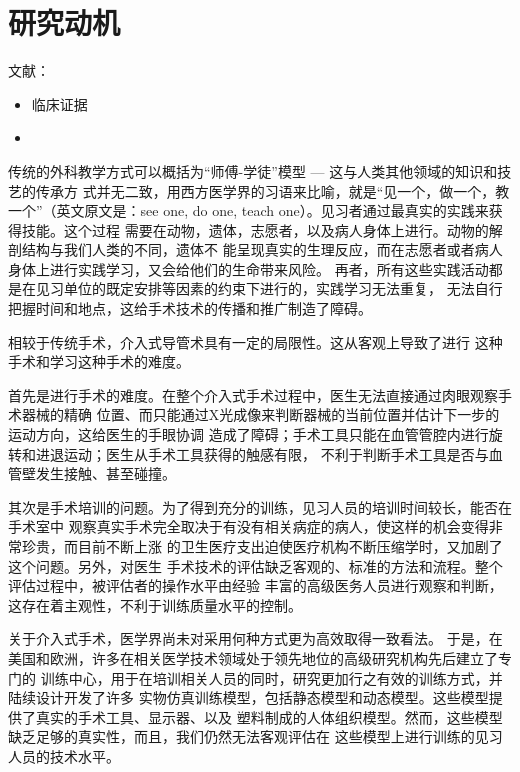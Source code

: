 \section{研究动机}
\label{sec1-2}

文献：
\begin{itemize}
  \item 临床证据\cite{Aggarwal2006}
  \item
\end{itemize}

传统的外科教学方式可以概括为“师傅-学徒”模型 --- 这与人类其他领域的知识和技艺的传承方
式并无二致，用西方医学界的习语来比喻，就是“见一个，做一个，教一个”（英文原文是：see
one, do one, teach one）\cite{Dawson1998}。见习者通过最真实的实践来获得技能。这个过程
需要在动物，遗体，志愿者，以及病人身体上进行。动物的解剖结构与我们人类的不同，遗体不
能呈现真实的生理反应，而在志愿者或者病人身体上进行实践学习，又会给他们的生命带来风险\cite{liu2003}。
再者，所有这些实践活动都是在见习单位的既定安排等因素的约束下进行的，实践学习无法重复，
无法自行把握时间和地点，这给手术技术的传播和推广制造了障碍。

相较于传统手术，介入式导管术具有一定的局限性\cite{basdogan2007}。这从客观上导致了进行
这种手术和学习这种手术的难度。

首先是进行手术的难度。在整个介入式手术过程中，医生无法直接通过肉眼观察手术器械的精确
位置、而只能通过X光成像来判断器械的当前位置并估计下一步的运动方向，这给医生的手眼协调
造成了障碍；手术工具只能在血管管腔内进行旋转和进退运动；医生从手术工具获得的触感有限，
不利于判断手术工具是否与血管壁发生接触、甚至碰撞。

其次是手术培训的问题。为了得到充分的训练，见习人员的培训时间较长，能否在手术室中
观察真实手术完全取决于有没有相关病症的病人，使这样的机会变得非常珍贵，而目前不断上涨
的卫生医疗支出迫使医疗机构不断压缩学时，又加剧了这个问题\cite{liu2003}。另外，对医生
手术技术的评估缺乏客观的、标准的方法和流程。整个评估过程中，被评估者的操作水平由经验
丰富的高级医务人员进行观察和判断，这存在着主观性，不利于训练质量水平的控制\cite{basdogan2007}。

关于介入式手术，医学界尚未对采用何种方式更为高效取得一致看法\cite{basdogan2007}。
于是，在美国和欧洲，许多在相关医学技术领域处于领先地位的高级研究机构先后建立了专门的
训练中心，用于在培训相关人员的同时，研究更加行之有效的训练方式，并陆续设计开发了许多
实物仿真训练模型，包括静态模型和动态模型\cite{Cooper2004Review}。这些模型提供了真实的手术工具、显示器、以及
塑料制成的人体组织模型。然而，这些模型缺乏足够的真实性，而且，我们仍然无法客观评估在
这些模型上进行训练的见习人员的技术水平。

